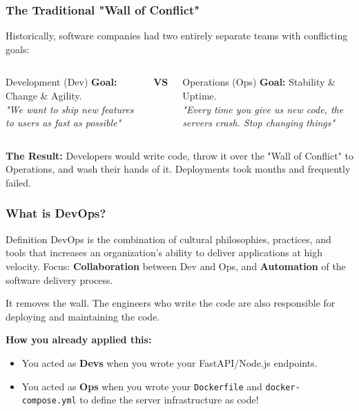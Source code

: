 \documentclass[xcolor=table]{beamer}
\begin{document}
\begin{frame}
    \frametitle{The Traditional "Wall of Conflict"}
    Historically, software companies had two entirely separate teams with conflicting goals:
    
    \vspace{0.3cm}
    \begin{columns}
        \begin{block}{Development (Dev)}
            \textbf{Goal:} Change \& Agility.\\
            \textit{"We want to ship new features to users as fast as possible"}
        \end{block}
        
        \centering
        \textbf{VS}
        
        \begin{alertblock}{Operations (Ops)}
            \textbf{Goal:} Stability \& Uptime.\\
            \textit{"Every time you give us new code, the servers crash. Stop changing things"}
        \end{alertblock}
    \end{columns}
    
    \vspace{0.4cm}
    \textbf{The Result:} Developers would write code, throw it over the "Wall of Conflict" to Operations, and wash their hands of it. Deployments took months and frequently failed.
\end{frame}

\begin{frame}
    \frametitle{What is DevOps?}
    \small
    \begin{block}{Definition}
        DevOps is the combination of cultural philosophies, practices, and tools that increases an organization's ability to deliver applications at high velocity. Focus: \textbf{Collaboration} between Dev and Ops, and \textbf{Automation} of the software delivery process.
    \end{block}
    
    \vspace{0.3cm}
    It removes the wall. The engineers who write the code are also responsible for deploying and maintaining the code.
    
    \vspace{0.2cm}
    \textbf{How you already applied this:}
    \begin{itemize}
        \item You acted as \textbf{Devs} when you wrote your FastAPI/Node.js endpoints.
        \item You acted as \textbf{Ops} when you wrote your \texttt{Dockerfile} and \texttt{docker-compose.yml} to define the server infrastructure as code!
    \end{itemize}
\end{frame}
\end{document}
